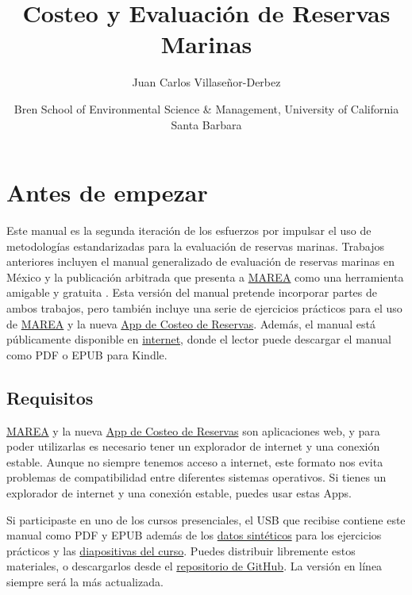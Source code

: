 \documentclass[]{book}
\title{Costeo y Evaluación de Reservas Marinas}
\author{Juan Carlos Villaseñor-Derbez}
\date{Bren School of Environmental Science \& Management, University of
California Santa Barbara}
\begin{document}
\maketitle

{
\setcounter{tocdepth}{1}
\tableofcontents
}
\hypertarget{antes-de-empezar}{%
\chapter*{Antes de empezar}\label{antes-de-empezar}}

Este manual es la segunda iteración de los esfuerzos por impulsar el uso
de metodologías estandarizadas para la evaluación de reservas marinas.
Trabajos anteriores incluyen el manual generalizado de evaluación de
reservas marinas en México \citep{villaseorderbez_2017} y la publicación
arbitrada que presenta a
\href{https://turfeffect.shinyapps.io/marea/}{MAREA} como una
herramienta amigable y gratuita \citep{villasenorderbez_2018}. Esta
versión del manual pretende incorporar partes de ambos trabajos, pero
también incluye una serie de ejercicios prácticos para el uso de
\href{https://turfeffect.shinyapps.io/marea/}{MAREA} y la nueva
\href{https://turfeffect.shinyapps.io/AppCosteo/}{App de Costeo de
Reservas}. Además, el manual está públicamente disponible en
\href{https://jcvdav.github.io/curso_marea/}{internet}, donde el lector
puede descargar el manual como PDF o EPUB para Kindle.

\hypertarget{requisitos}{%
\section{Requisitos}\label{requisitos}}

\href{https://turfeffect.shinyapps.io/marea/}{MAREA} y la nueva
\href{https://turfeffect.shinyapps.io/AppCosteo/}{App de Costeo de
Reservas} son aplicaciones web, y para poder utilizarlas es necesario
tener un explorador de internet y una conexión estable. Aunque no
siempre tenemos acceso a internet, este formato nos evita problemas de
compatibilidad entre diferentes sistemas operativos. Si tienes un
explorador de internet y una conexión estable, puedes usar estas Apps.

Si participaste en uno de los cursos presenciales, el USB que recibise
contiene este manual como PDF y EPUB además de los
\href{https://github.com/jcvdav/curso_marea/materiales/datos}{datos
sintéticos} para los ejercicios prácticos y las
\href{https://github.com/jcvdav/curso_marea/materiales/diapositivas}{diapositivas
del curso}. Puedes distribuir libremente estos materiales, o
descargarlos desde el
\href{https://github.com/jcvdav/curso_marea}{repositorio de GitHub}. La
versión en línea siempre será la más actualizada.
\end{document}
